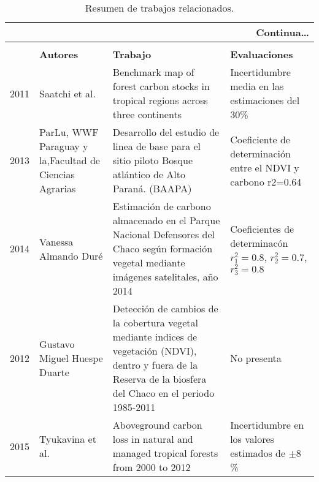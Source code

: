 	\begin{longtable}{|p{3cm}|p{3cm}|p{3cm}|p{3cm}|}



		 \hline
		 \endhead
		 \hline
		 \multicolumn{4}{|r|}{{Continua\ldots}} \\

		 \hline
		 \endfoot
		 
		 \hline 
		 		 		\caption{Resumen de trabajos relacionados.} \label{t:resumenrelacionado} \\
		 \endlastfoot
		 
\multicolumn{1}{|l|}{{\bf A\~{n}o}} & \multicolumn{1}{l|}{{\bf Autores}}                                                                                                                                            & \multicolumn{1}{l|}{{\bf Trabajo}} & \multicolumn{1}{l|}{{\bf Evaluaciones}} \\ \hline
		2011          & Saatchi et al.                                         & Benchmark map of forest carbon stocks in tropical regions across three continents                                                                                      & Incertidumbre media en las estimaciones del 30\%                                          \\ \hline
		2013          & ParLu, WWF Paraguay y la,Facultad de Ciencias Agrarias & Desarrollo del estudio de linea de base para el sitio piloto Bosque atl\'antico de Alto Paran\'a. (BAAPA)                                                               & Coeficiente de determinaci\'on entre el NDVI y carbono r2=0.64                              \\ \hline
		2014           & Vanessa Almando Dur\'e                                 & Estimaci\'on de carbono almacenado en el Parque Nacional Defensores del Chaco seg\'un formaci\'on vegetal mediante im\'agenes satelitales, a\~{n}o 2014              & Coeficientes de determinac\'on $ r_{1}^{2}=0.8$, $ r_{2}^{2}=0.7 $, $r_{3}^{2}=0.8 $      \\ \hline
		2012          & Gustavo Miguel Huespe Duarte                           & Detecci\'on de cambios de la cobertura vegetal mediante indices de vegetaci\'on (NDVI), dentro y fuera de la Reserva de la biosfera del Chaco en el periodo 1985-2011  & No presenta                                                                               \\ \hline
		2015          & Tyukavina et al.                                       & Aboveground carbon loss in natural and managed tropical forests from 2000 to 2012                                                                                      & Incertidumbre en los valores estimados de $ \pm 8 $\%                                     \\ \hline

\end{longtable}
